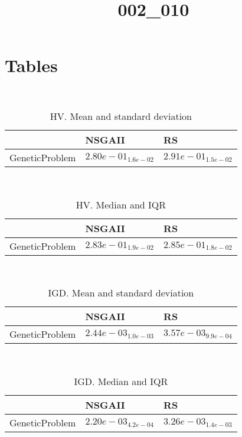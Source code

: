 \documentclass{article}
\title{002_010}
\author{}
\begin{document}
\maketitle
\section{Tables}
\
\begin{table}
\caption{HV. Mean and standard deviation}
\label{table:mean.HV}
\centering
\begin{scriptsize}
\begin{tabular}{lll}
\hline & NSGAII &  RS\\
\hline
GeneticProblem & \cellcolor{gray25}$  2.80e-01_{ 1.6e-02}$ & \cellcolor{gray95}$  2.91e-01_{ 1.5e-02}$ \\
\hline
\end{tabular}
\end{scriptsize}
\end{table}
\
\begin{table}
\caption{HV. Median and IQR}
\label{table:median.HV}
\begin{scriptsize}
\centering
\begin{tabular}{lll}
\hline & NSGAII &  RS\\
\hline
GeneticProblem & \cellcolor{gray25}$  2.83e-01_{ 1.9e-02}$ & \cellcolor{gray95}$  2.85e-01_{ 1.8e-02}$ \\
\hline
\end{tabular}
\end{scriptsize}
\end{table}
\
\begin{table}
\caption{IGD. Mean and standard deviation}
\label{table:mean.IGD}
\centering
\begin{scriptsize}
\begin{tabular}{lll}
\hline & NSGAII &  RS\\
\hline
GeneticProblem & \cellcolor{gray95}$  2.44e-03_{ 1.0e-03}$ & $  3.57e-03_{ 9.9e-04}$ \\
\hline
\end{tabular}
\end{scriptsize}
\end{table}
\
\begin{table}
\caption{IGD. Median and IQR}
\label{table:median.IGD}
\begin{scriptsize}
\centering
\begin{tabular}{lll}
\hline & NSGAII &  RS\\
\hline
GeneticProblem & \cellcolor{gray95}$  2.20e-03_{ 4.2e-04}$ & $  3.26e-03_{ 1.4e-03}$ \\
\hline
\end{tabular}
\end{scriptsize}
\end{table}
\end{document}

